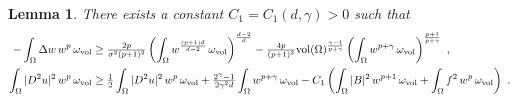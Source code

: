 \documentclass[10pt, a4paper, reqno, oneside]{amsart}
\theoremstyle{plain}
\theoremstyle{definition}
\theoremstyle{plain}
\newtheorem{lemma}[theo]{Lemma}
\theoremstyle{definition}
\theoremstyle{plain}
\renewcommand{\=}{:=}
\begin{document}
\begin{lemma}
There exists a constant $C_1=C_1(d,\gamma)>0$ such that
\begin{align}
\label{est1}
-\int_\Omega \Delta w\,w^p\,\omega_{\mathrm{vol}} &\geq
\tfrac{2p}{\sigma^2(p+1)^2} \left(\int_\Omega w^\frac{(p+1)d}{d-2}\,\omega_{\mathrm{vol}}\right)^{\frac{d-2}d} -\tfrac{4p}{(p+1)^2}{\rm vol}(\Omega)^{\frac{\gamma-1}{p+\gamma}}\left(\int_\Omega w^{p+\gamma}\,\omega_{\mathrm{vol}}\right)^{\frac{p+1}{p+\gamma}} \,\, , \\
\label{est2}
\int_\Omega |D^2u|^2\,w^p\,\omega_{\mathrm{vol}} &\geq
\tfrac12 \int_\Omega |D^2u|^2\,w^p\,\omega_{\mathrm{vol}}
+\tfrac{2^{\gamma}-1}{2\gamma^2d}\int_\Omega w^{p+\gamma}\,\omega_{\mathrm{vol}}
-C_1\left(\int_\Omega |B|^2\,w^{p+1}\,\omega_{\mathrm{vol}}
+\int_\Omega f^2\,w^p\,\omega_{\mathrm{vol}}\right) \,\, .
\end{align}
\end{lemma}
\end{document}
